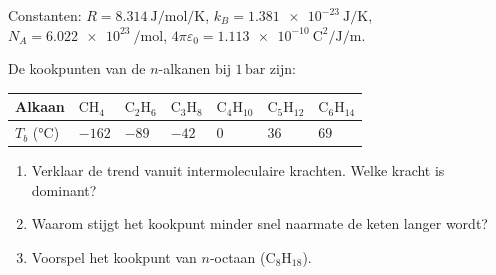 
Constanten: $R = \SI{8.314}{\joule\per\mole\per\kelvin}$, $k_B = \SI{1.381e-23}{\joule\per\kelvin}$, $N_A = \SI{6.022e23}{\per\mole}$, $4\pi\varepsilon_0 = \SI{1.113e-10}{\coulomb\squared\per\joule\per\metre}$.

\begin{oefening}
De kookpunten van de \(n\)-alkanen bij \(1\,\mathrm{bar}\) zijn:

\begin{center}
\begin{tabular}{lllllll}
\toprule
Alkaan & \(\mathrm{CH_4}\) & \(\mathrm{C_2H_6}\) & \(\mathrm{C_3H_8}\) & \(\mathrm{C_4H_{10}}\) & \(\mathrm{C_5H_{12}}\) & \(\mathrm{C_6H_{14}}\) \\
\midrule
\(T_b\) (°C) & \(-162\) & \(-89\) & \(-42\) & \(0\) & \(36\) & \(69\) \\
\bottomrule
\end{tabular}
\end{center}

\begin{enumerate}
\item[(a)]
  Verklaar de trend vanuit intermoleculaire krachten. Welke kracht is dominant?
\item[(b)]
  Waarom stijgt het kookpunt minder snel naarmate de keten langer wordt?
\item[(c)]
  Voorspel het kookpunt van \(n\)-octaan (\(\mathrm{C_8H_{18}}\)).
\end{enumerate}
\end{oefening}

